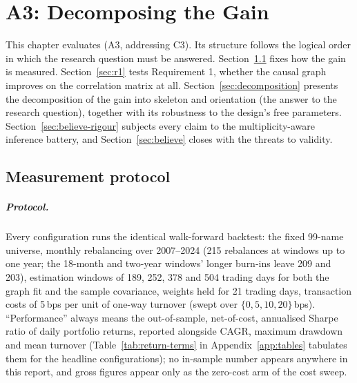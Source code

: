 \chapter{A3: Decomposing the Gain}
\label{chap:evaluation}

This chapter evaluates (A3, addressing C3). Its structure follows the
logical order in which the research question must be answered. Section~\ref{sec:method} fixes
how the gain is measured. Section~\ref{sec:r1} tests Requirement 1,
whether the causal graph improves on the correlation matrix at all.
Section~\ref{sec:decomposition} presents the decomposition of the gain
into
skeleton and orientation (the answer to the research question), together with its
robustness to the design's free parameters. Section~\ref{sec:believe-rigour}
subjects every claim to the multiplicity-aware inference battery, and
Section~\ref{sec:believe} closes with the threats to validity.

\section{Measurement protocol}
\label{sec:method}

\paragraph{Protocol.} Every configuration runs the identical walk-forward
backtest: the fixed 99-name universe, monthly rebalancing over 2007--2024
(215 rebalances at windows up to one year; the 18-month and two-year
windows' longer burn-ins leave 209 and 203), estimation windows of 189, 252,
378 and 504 trading days for both the graph fit and the sample covariance,
weights held for 21 trading days, transaction costs of 5\,bps per unit of
one-way turnover (swept over $\{0,5,10,20\}$\,bps). ``Performance'' always means the out-of-sample,
net-of-cost, annualised Sharpe ratio of daily portfolio returns, reported
alongside CAGR, maximum drawdown and mean turnover
(Table~\ref{tab:return-terms} in Appendix~\ref{app:tables} tabulates them
for the headline
configurations); no in-sample number appears anywhere in this report, and
gross figures appear only as the zero-cost arm of the cost sweep.

